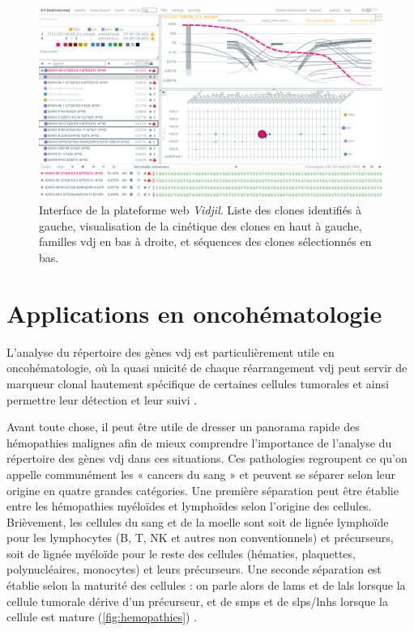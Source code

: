\begin{figure}[H]
    \centering
    \includegraphics[width=1\textwidth]{images/vidjil-web.png}
    \caption{Interface de la plateforme web \textit{Vidjil}.
        Liste des clones identifiés à gauche, visualisation de la cinétique des clones en haut à gauche,
        familles \gls{vdj} en bas à droite, et séquences des clones sélectionnés en bas.}
    \label{fig:vidjil-web}
\end{figure}

\section{Applications en oncohématologie}

L'analyse du répertoire des gènes \gls{vdj} est particulièrement utile en
oncohématologie, où la quasi unicité de chaque réarrangement \gls{vdj} peut
servir de marqueur clonal hautement spécifique de certaines cellules tumorales
et ainsi permettre leur détection et leur suivi
\cite{hultcrantzBaselineVDJClonotype2020}.

\vspace{1em}
Avant toute chose, il peut être utile de dresser un panorama rapide des
hémopathies malignes afin de mieux comprendre l'importance de l'analyse du
répertoire des gènes \gls{vdj} dans ces situations. Ces pathologies regroupent
ce qu'on appelle communément les « cancers du sang » et peuvent se séparer
selon leur origine en quatre grandes catégories. Une première séparation peut
être établie entre les hémopathies myéloïdes et lymphoïdes selon l'origine des
cellules. Brièvement, les cellules du sang et de la moelle sont soit de lignée
lymphoïde pour les lymphocytes (B, T, NK et autres non conventionnels) et
précurseurs, soit de lignée myéloïde pour le reste des cellules (hématies,
plaquettes, polynucléaires, monocytes) et leurs précurseurs. Une seconde
séparation est établie selon la maturité des cellules : on parle alors de
\glspl{lam} et de \glspl{lal} lorsque la cellule tumorale dérive d'un
précurseur, et de \glspl{smp} et de \glspl{slp}/\glspl{lnh} lorsque la cellule
est mature (\autoref{fig:hemopathies}) \cite{alaggio5thEditionWorld2022a,
khoury5thEditionWorld2022}.

